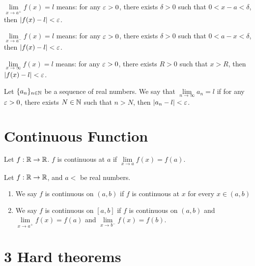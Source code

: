 \begin{definition*}
  $\lim\limits_{x \to a^+} f(x) = l$ means: for any $\varepsilon > 0$, there exists $\delta > 0$ such that $0 < x-a < \delta$, then $|f(x)-l| < \varepsilon$.
\end{definition*}

\begin{definition*}
  $\lim\limits_{x \to a^-} f(x) = l$ means: for any $\varepsilon > 0$, there exists $\delta > 0$ such that $0 < a-x < \delta$, then $|f(x)-l| < \varepsilon$.
\end{definition*}

\begin{definition*}
  $\lim\limits_{x \to \infty} f(x) = l$ means: for any $\varepsilon > 0$, there exists $R > 0$ such that $x > R$, then $|f(x)-l| < \varepsilon$.
\end{definition*}

\begin{definition*}
  Let $\{a_n\}_{n \in \mathbb N}$ be a sequence of real numbers. We say that $\lim\limits_{n \to \infty} a_n = l$ if for any $\varepsilon > 0$, there exists $N \in \mathbb N$ such that $n > N$, then $|a_n-l| < \varepsilon$.
\end{definition*}

\section{Continuous Function}

\begin{definition*}
  Let $f: \mathbb R \to \mathbb R$.
  $f$ is continuous at $a$ if $\lim\limits_{x \to a} f(x) = f(a)$.
\end{definition*}

\begin{definition*}
  Let $f: \mathbb R \to \mathbb R$, and $a < $ be real numbers.
  \begin{enumerate}
    \item We say $f$ is continuous on $(a, b)$ if $f$ is continuous at $x$ for every $x \in (a, b)$
    \item We say $f$ is continuous on $[a, b]$ if $f$ is continuous on $(a, b)$ and $\lim\limits_{x \to a^+} f(x) = f(a)$ and $\lim\limits_{x \to b^-} f(x) = f(b)$.
  \end{enumerate}
\end{definition*}

\section{3 Hard theorems}

